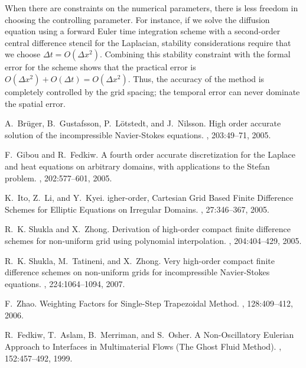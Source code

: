 \documentclass[fleqn,12pt,twoside]{article}
\def\dt{\Delta t}
\def\dx{\Delta x}
\begin{document}
When there are constraints on the numerical parameters, there is less freedom 
in choosing the controlling parameter.  For instance, if we solve the 
diffusion equation using a forward Euler time integration scheme with a 
second-order central difference stencil for the Laplacian, stability
considerations require that we choose $\dt = O(\dx^2)$.  
Combining this stability constraint with the formal error for the scheme
shows that the practical error is 
$O(\dx^2) + O(\dt) = O(\dx^2)$.  Thus, the accuracy of the 
method is completely controlled by the grid spacing; the temporal error can 
never dominate the spatial error.

%

\begin{thebibliography}{10}

A.~Br\"uger, B.~Gustafsson, P.~L\"otstedt, and J.~Nilsson.
\newblock High order accurate solution of the incompressible {N}avier-{S}tokes
  equations.
, 203:49--71, 2005.

F.~Gibou and R.~Fedkiw.
\newblock A fourth order accurate discretization for the {L}aplace and heat
  equations on arbitrary domains, with applications to the {S}tefan problem.
, 202:577--601, 2005.

K.~Ito, Z.~Li, and Y.~Kyei.
igher-order, {C}artesian {G}rid {B}ased {F}inite {D}ifference
  {S}chemes for {E}lliptic {E}quations on {I}rregular {D}omains.
, 27:346--367, 2005.

R.~K. Shukla and X.~Zhong.
\newblock Derivation of high-order compact finite difference schemes for
  non-uniform grid using polynomial interpolation.
, 204:404--429, 2005.

R.~K. Shukla, M.~Tatineni, and X.~Zhong.
\newblock Very high-order compact finite difference schemes on non-uniform
  grids for incompressible {N}avier-{S}tokes equations.
, 224:1064--1094, 2007.

F.~Zhao.
\newblock Weighting {F}actors for {S}ingle-{S}tep {T}rapezoidal {M}ethod.
, 128:409--412, 2006.

R.~Fedkiw, T.~Aslam, B.~Merriman, and S.~Osher.
\newblock A {N}on-{O}scillatory {E}ulerian {A}pproach to {I}nterfaces in
  {M}ultimaterial {F}lows ({T}he {G}host {F}luid {M}ethod).
, 152:457--492, 1999.


\end{thebibliography}
\end{document}
